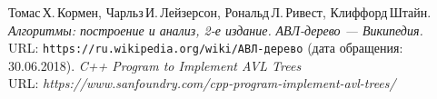 \begin{thebibliography}{99}
Томас\,Х.\,Кормен, Чарльз\,И.\,Лейзерсон, Рональд\,Л.\,Ривест, Клиффорд\,Штайн.
{\itshape Алгоритмы: построение и анализ, 2-е издание.} 
{\itshape АВЛ-дерево — Википедия.} \\URL: \texttt{https://ru.wikipedia.org/wiki/АВЛ-дерево} (дата обращения: 30.06.2018). 
{\itshape C++ Program to Implement AVL Trees} \\URL: \textit{https://www.sanfoundry.com/cpp-program-implement-avl-trees/}
\end{thebibliography}
\pagebreak


